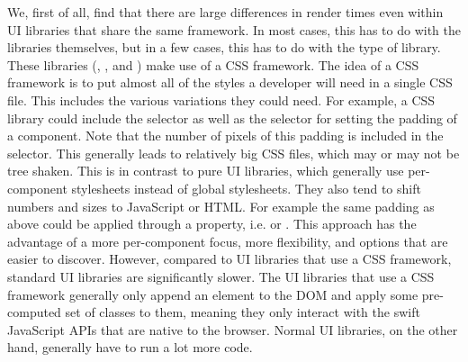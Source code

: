 We, first of all, find that there are large differences in render times even within UI libraries that share the same framework. In most cases, this has to do with the libraries themselves, but in a few cases, this has to do with the type of library. These libraries (, , and ) make use of a CSS framework. The idea of a CSS framework is to put almost all of the styles a developer will need in a single CSS file. This includes the various variations they could need. For example, a CSS library could include the  selector as well as the  selector for setting the padding of a component. Note that the number of pixels of this padding is included in the selector. This generally leads to relatively big CSS files, which may or may not be tree shaken. This is in contrast to pure UI libraries, which generally use per-component stylesheets instead of global stylesheets. They also tend to shift numbers and sizes to JavaScript or HTML\@. For example the same padding as above could be applied through a property, i.e.  or . This approach has the advantage of a more per-component focus, more flexibility, and options that are easier to discover. However, compared to UI libraries that use a CSS framework, standard UI libraries are significantly slower. The UI libraries that use a CSS framework generally only append an element to the DOM and apply some pre-computed set of classes to them, meaning they only interact with the swift JavaScript APIs that are native to the browser. Normal UI libraries, on the other hand, generally have to run a lot more code.

